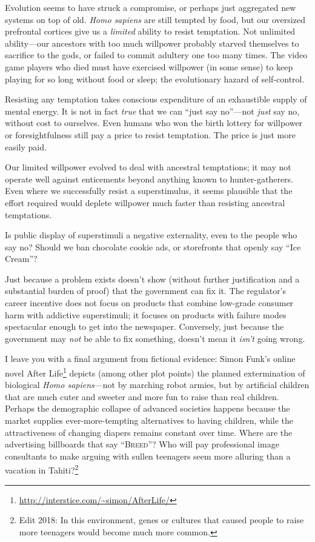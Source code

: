  Evolution seems to have struck a compromise, or perhaps just
aggregated new systems on top of old. \textit{Homo sapiens} are still
tempted by food, but our oversized prefrontal cortices give us a
\textit{limited} ability to resist temptation. Not unlimited
ability---our ancestors with too much willpower probably starved
themselves to sacrifice to the gods, or failed to commit adultery one
too many times. The video game players who died must have exercised
willpower (in some sense) to keep playing for so long without food or
sleep; the evolutionary hazard of self-control.


 Resisting any temptation takes conscious expenditure of an
exhaustible supply of mental energy. It is not in fact \textit{true}
that we can ``just say no''---not
\textit{just} say no, without cost to ourselves. Even humans who won
the birth lottery for willpower or foresightfulness still pay a price
to resist temptation. The price is just more easily paid.


 Our limited willpower evolved to deal with ancestral temptations;
it may not operate well against enticements beyond anything known to
hunter-gatherers. Even where we successfully resist a superstimulus, it
seems plausible that the effort required would deplete willpower much
faster than resisting ancestral temptations.


 Is public display of superstimuli a negative externality, even to
the people who say no? Should we ban chocolate cookie ads, or
storefronts that openly say ``Ice
Cream''?


 Just because a problem exists doesn't show
(without further justification and a substantial burden of proof) that
the government can fix it. The regulator's career
incentive does not focus on products that combine low-grade consumer
harm with addictive superstimuli; it focuses on products with failure
modes spectacular enough to get into the newspaper. Conversely, just
because the government may \textit{not} be able to fix something,
doesn't mean it \textit{isn't} going
wrong.


 I leave you with a final argument from fictional evidence: Simon
Funk's online novel After Life\footnote{\url{http://interstice.com/~simon/AfterLife/}} depicts (among other
plot points) the planned extermination of biological \textit{Homo
sapiens}{}---not by marching robot armies, but by artificial children
that are much cuter and sweeter and more fun to raise than real
children. Perhaps the demographic collapse of advanced societies
happens because the market supplies ever-more-tempting alternatives to
having children, while the attractiveness of changing diapers remains
constant over time. Where are the advertising billboards that say
``\textsc{Breed}''? Who will pay professional
image consultants to make arguing with sullen teenagers seem more
alluring than a vacation in Tahiti?\footnote{Edit 2018: In this environment, genes or cultures that caused people to raise more teenagers would become much more common.}


